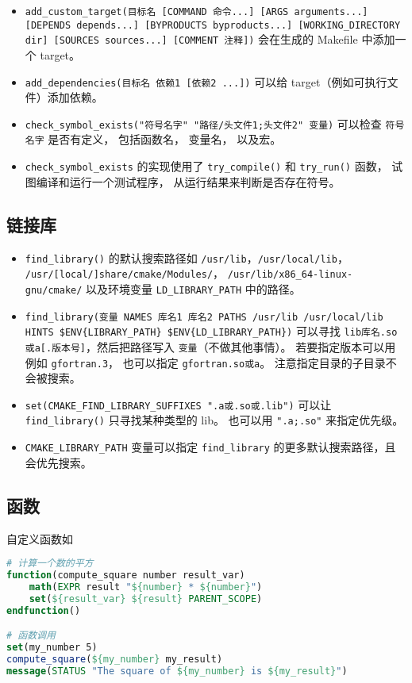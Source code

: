 \begin{itemize}
\item \verb`add_custom_target(目标名 [COMMAND 命令...] [ARGS arguments...] [DEPENDS depends...] [BYPRODUCTS byproducts...] [WORKING_DIRECTORY dir] [SOURCES sources...] [COMMENT 注释])` 会在生成的 Makefile 中添加一个 target。
\item \verb`add_dependencies(目标名 依赖1 [依赖2 ...])` 可以给 target（例如可执行文件）添加依赖。
\item \verb`check_symbol_exists("符号名字" "路径/头文件1;头文件2" 变量)` 可以检查 \verb`符号名字` 是否有定义， 包括函数名， 变量名， 以及宏。
\item \verb`check_symbol_exists` 的实现使用了 \verb`try_compile()` 和 \verb`try_run()` 函数， 试图编译和运行一个测试程序， 从运行结果来判断是否存在符号。
\end{itemize}

\subsection{链接库}
\begin{itemize}
\item \verb`find_library()` 的默认搜索路径如 \verb`/usr/lib`，\verb`/usr/local/lib`， \verb`/usr/[local/]share/cmake/Modules/`， \verb`/usr/lib/x86_64-linux-gnu/cmake/` 以及环境变量 \verb`LD_LIBRARY_PATH` 中的路径。
\item \verb`find_library(变量 NAMES 库名1 库名2 PATHS /usr/lib /usr/local/lib HINTS $ENV{LIBRARY_PATH} $ENV{LD_LIBRARY_PATH})` 可以寻找 \verb`lib库名.so或a[.版本号]`，然后把路径写入 \verb`变量`（不做其他事情）。 若要指定版本可以用例如 \verb`gfortran.3`， 也可以指定 \verb`gfortran.so或a`。 注意指定目录的子目录不会被搜索。
\item \verb`set(CMAKE_FIND_LIBRARY_SUFFIXES ".a或.so或.lib")` 可以让 \verb`find_library()` 只寻找某种类型的 lib。 也可以用 \verb`".a;.so"` 来指定优先级。
\item \verb`CMAKE_LIBRARY_PATH` 变量可以指定 \verb`find_library` 的更多默认搜索路径，且会优先搜索。
\end{itemize}

\subsection{函数}
自定义函数如
\begin{lstlisting}[language=cmake]
# 计算一个数的平方
function(compute_square number result_var)
    math(EXPR result "${number} * ${number}")
    set(${result_var} ${result} PARENT_SCOPE)
endfunction()

# 函数调用
set(my_number 5)
compute_square(${my_number} my_result)
message(STATUS "The square of ${my_number} is ${my_result}")
\end{lstlisting}

